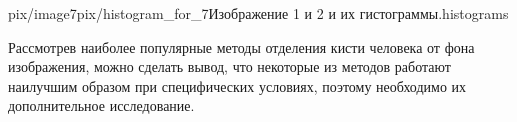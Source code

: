 {pix/image7}{pix/histogram_for_7}{Изображение 1 и 2
и их гистограммы.}{histograms}

\newpage



Рассмотрев наиболее популярные методы отделения кисти человека от фона изображения, можно сделать
вывод, что некоторые из методов работают наилучшим образом при специфических условиях, поэтому
необходимо их дополнительное исследование. 








